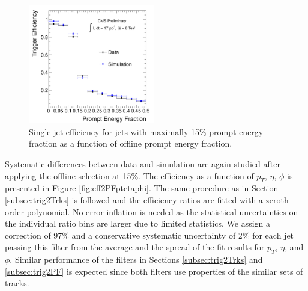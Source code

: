 \begin{figure}[htbp]
\centering
 \includegraphics[width=0.49\textwidth]{plots/trigger/effHT300_PF_PromptEnergyFrac.pdf}
\caption{Single jet efficiency for jets with maximally 15\% prompt energy fraction as a function of offline prompt energy fraction. \label{fig:eff2PF}}
\end{figure}     

Systematic differences between data and simulation are again studied after applying the offline selection at 15\%.
 The efficiency as a function of $p_T$, $\eta$, $\phi$ is presented in Figure \ref{fig:eff2PFptetaphi}. 
The same procedure as in Section 
\ref{subsec:trig2Trks} is followed and the efficiency ratios are fitted with a zeroth order polynomial.
 No error inflation is needed as the statistical uncertainties on the individual ratio bins are larger
due to limited statistics.
 We assign a correction of 97\% and a conservative systematic uncertainty of 2\% for
each jet passing this filter from the average and the spread of the fit results for $p_T$, $\eta$, and $\phi$.
Similar performance of the filters in Sections \ref{subsec:trig2Trks} and \ref{subsec:trig2PF} 
is expected since both filters use properties of the similar sets of tracks.

